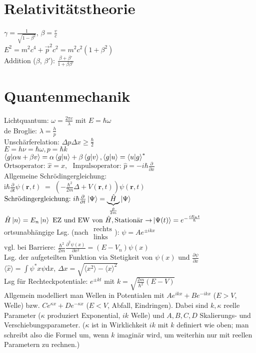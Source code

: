 \documentclass[a4paper, 11pt, fleqn]{article}
\renewcommand{\vec}{\overrightarrow}
\newcommand{\fpartial}[1]{\frac{\partial}{\partial #1}}
\newcommand{\ffpartial}[2]{\frac{\partial #1}{\partial #2}}
\begin{document}
\begin{multicols}{2}
\section{Relativitätstheorie}
$\gamma = \frac{1}{\sqrt{1 - \beta^2}}$, $\beta = \frac{v}{c}$\\
$E^2 = m^2 c^4 + \vec{p}^2 c^2 = m^2 c^2 (1 + \beta^2)$\\
Addition ($\beta$, $\beta'$): $\frac{\beta + \beta'}{1 + \beta \beta'}$

\section{Quantenmechanik}
Lichtquantum: $\omega = \frac{2 \pi c}{\lambda}$ mit $E = \hbar \omega$\\
de Broglie: $\lambda = \frac{h}{p}$\\
Unschärferelation: $\Delta p \Delta x \geq \frac{\hbar}{2}$\\
$E = h \nu = \hbar \omega, p = \hbar k$\\
$\braket{g | \alpha u + \beta v} = \alpha \braket{g | u} + \beta \braket{g | v}, \braket{g | u} = \braket{u | g}^\ast$\\
$\text{Ortsoperator:~} \hat{x} = x, \text{~~Impulsoperator:~} \hat{p} = -i \hbar \fpartial{x}$\\
Allgemeine Schrödingergleichung:\\
 $\mathrm i\hbar\frac{\partial}{\partial t}\psi(\mathbf{r},t) \;=\; \left(- \frac{\hbar^2}{2m}\Delta + V(\mathbf{r},t)\right)\psi(\mathbf{r},t)$\\
$\text{Schrödingergleichung:~} i\hbar \fpartial{t} \ket{\Psi} = \underbrace{\hat{H}}_{\frac{\hat{p}}{2m}} \ket{\Psi}$\\
$\hat{H} \ket{n} = E_n \ket{n} \text{~EZ und EW von $\hat{H}$}, \text{Stationär $\rightarrow$} \ket{\Psi(t)} = e^{-\frac{i E_n t}{\hbar}}$\\
ortsunabhängige Lsg. (nach $\substack{\text{rechts}\\\text{links}}$): $\psi = A e^{\pm i k x}$\\
$\text{vgl. bei Barriere:~} \frac{\hbar^2}{2m}\frac{\partial^2 \psi(x)}{\partial x^2} = (E - V_n) \psi(x)$\\
Lsg. der aufgeteilten Funktion via Stetigkeit von $\psi(x)$ und $\ffpartial{\psi}{x}$\\
$\langle \hat{x} \rangle = \int \psi^\ast x \psi \mathrm{d} x$, $\Delta x = \sqrt{\langle x^2 \rangle - \langle x \rangle^2}$\\
Lsg für Rechteckpotentiale: $e^{\pm kt}$ mit $k= \sqrt{\frac{2m}{\hbar^2}(E-V)}$\\
Allgemein modelliert man Wellen in Potentialen mit $Ae^{ikx}+Be^{-ikx}$ ($E>V$, Welle) bzw. $Ce^{\kappa x}+De^{-\kappa x}$ ($E<V$, Abfall, Eindringen).
Dabei sind $k,\kappa$ reelle Parameter ($\kappa$ produziert Exponential, $ik$ Welle) und $A,B,C,D$ Skalierungs- und Verschiebungsparameter.
($\kappa$ ist in Wirklichkeit $ik$ mit $k$ definiert wie oben; man schreibt also die Formel um, wenn $k$ imaginär wird, um weiterhin nur mit reellen Parametern zu rechnen.)


\end{multicols}
\end{document}
